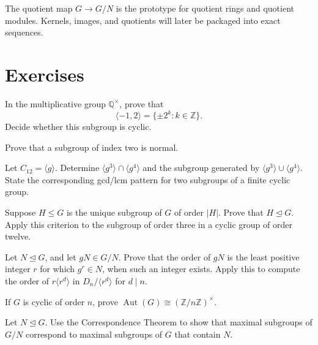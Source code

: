 \begin{remark}
The quotient map \(G\to G/N\) is the prototype for quotient rings and quotient
modules.  Kernels, images, and quotients will later be packaged into exact
sequences.
\end{remark}

\section*{Exercises}
\begin{exercise}[Basic]
In the multiplicative group \(\mathbb Q^\times\), prove that
\[\langle-1,2\rangle=\{\pm2^k:k\in\mathbb Z\}.\]
Decide whether this subgroup is cyclic.
\end{exercise}
\begin{exercise}[Core]
Prove that a subgroup of index two is normal.
\end{exercise}
\begin{exercise}[Core]
Let \(C_{12}=\langle g\rangle\).  Determine
\(\langle g^3\rangle\cap\langle g^4\rangle\) and the subgroup generated by
\(\langle g^3\rangle\cup\langle g^4\rangle\).  State the corresponding
gcd/lcm pattern for two subgroups of a finite cyclic group.
\end{exercise}
\begin{exercise}[Core]
Suppose \(H\leq G\) is the unique subgroup of \(G\) of order \(|H|\). Prove
that \(H\trianglelefteq G\).  Apply this criterion to the subgroup of order
three in a cyclic group of order twelve.
\end{exercise}
\begin{exercise}[Core]
Let \(N\trianglelefteq G\), and let \(gN\in G/N\).  Prove that the order of
\(gN\) is the least positive integer \(r\) for which \(g^r\in N\), when
such an integer exists.  Apply this to compute the order of \(r\langle r^d\rangle\)
in \(D_n/\langle r^d\rangle\) for \(d\mid n\).
\end{exercise}
\begin{exercise}[Further]
If \(G\) is cyclic of order \(n\), prove
\(\operatorname{Aut}(G)\cong(\mathbb Z/n\mathbb Z)^\times\).
\end{exercise}
\begin{exercise}
Let \(N\trianglelefteq G\).  Use the Correspondence Theorem to show that
maximal subgroups of \(G/N\) correspond to maximal subgroups of \(G\) that
contain \(N\).
\end{exercise}
